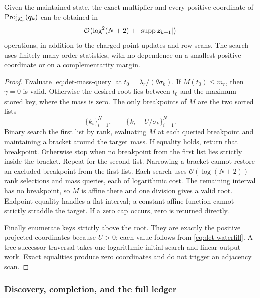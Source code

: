 \begin{lemma}
\label{lem:det-reporter}
Given the maintained state, the exact multiplier and every positive
coordinate of $\operatorname{Proj}_{\mathcal{K}_r}(\bm{q}_k)$ can be obtained in
\begin{equation*}
 \mathcal{O}\bigl(\log^2(N+2)+|\operatorname{supp}\bm{z}_{k+1}|\bigr)
\end{equation*}
operations, in addition to the charged point updates and row scans.
The search uses finitely many order statistics, with no dependence on a
smallest positive coordinate or on a complementarity margin.
\end{lemma}
\begin{proof}
Evaluate \cref{eq:det-mass-query} at $t_0=\lambda_r/(\theta\sigma_k)$.
If $M(t_0)\leq m_r$, then $\gamma=0$ is valid. Otherwise the desired root
lies between $t_0$ and the maximum stored key, where the mass is zero.
The only breakpoints of $M$ are the two sorted lists
\begin{equation*}
 \{k_i\}_{i=1}^N,\qquad \{k_i-U/\sigma_k\}_{i=1}^N.
\end{equation*}
Binary search the first list by rank, evaluating $M$ at each queried
breakpoint and maintaining a bracket around the target mass. If equality
holds, return that breakpoint. Otherwise stop when no breakpoint from the
first list lies strictly inside the bracket. Repeat for the second list.
Narrowing a bracket cannot restore an excluded breakpoint from the first
list. Each search uses $\mathcal{O}(\log(N+2))$ rank selections and mass queries,
each of logarithmic cost. The remaining interval has no breakpoint, so
$M$ is affine there and one division gives a valid root. Endpoint equality
handles a flat interval; a constant affine function cannot strictly
straddle the target. If a zero cap occurs, zero is returned directly.

Finally enumerate keys strictly above the root. They are exactly the
positive projected coordinates because $U>0$; each value follows from
\cref{eq:det-waterfill}. A tree successor traversal takes one logarithmic
initial search and linear output work. Exact equalities produce zero
coordinates and do not trigger an adjacency scan.
\end{proof}

\subsubsection{Discovery, completion, and the full ledger}

